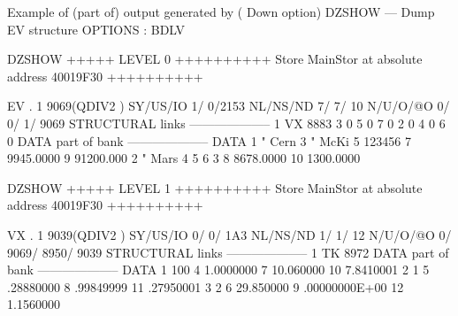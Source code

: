 \begin{landscapebody}
\mbox{}\vspace*{1cm}
\begin{XMPt}{Example of (part of) output generated by  ( Down option)}
DZSHOW --- Dump EV structure                                                                       OPTIONS : BDLV                
                                                                                                                                 
DZSHOW  +++++ LEVEL     0 ++++++++++            Store  MainStor at absolute address 40019F30      ++++++++++                     
                                                                                                                                 
 EV  .     1     9069(QDIV2   ) SY/US/IO    1/    0/2153 NL/NS/ND    7/    7/      10 N/U/O/@O       0/       0/       1/    9069
STRUCTURAL links                                          --------------------                                                   
          1    VX        8883     3                 0     5                 0     7                 0                            
          2                 0     4                 0     6                 0                                                    
DATA part of bank                                         --------------------                                                   
DATA      1     "        Cern     3     "        McKi     5            123456     7     9945.0000         9     91200.000        
          2     "        Mars     4                 5     6                 3     8     8678.0000        10     1300.0000        
                                                                                                                                 
DZSHOW  +++++ LEVEL     1 ++++++++++            Store  MainStor at absolute address 40019F30      ++++++++++                     
                                                                                                                                 
 VX  .     1     9039(QDIV2   ) SY/US/IO    0/    0/ 1A3 NL/NS/ND    1/    1/      12 N/U/O/@O       0/    9069/    8950/    9039
STRUCTURAL links                                          --------------------                                                   
          1    TK        8972                                                                                                    
DATA part of bank                                         --------------------                                                   
DATA      1               100     4     1.0000000         7     10.060000        10     7.8410001                                
          2                 1     5     .28880000         8     .99849999        11     .27950001                                
          3                 2     6     29.850000         9     .00000000E+00    12     1.1560000                                
                                                                                                                                 

\end{XMPt}
\end{landscapebody}
